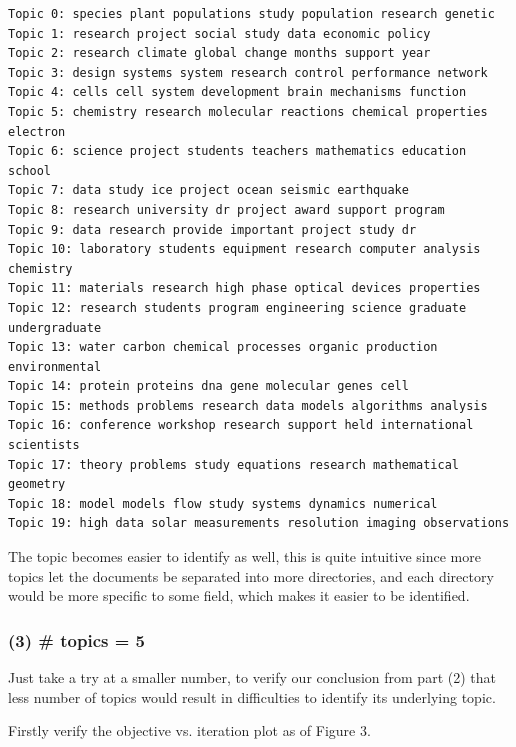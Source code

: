 \documentclass[submit]{harvardml}
\begin{document}
\begin{lstlisting}
Topic 0: species plant populations study population research genetic
Topic 1: research project social study data economic policy
Topic 2: research climate global change months support year
Topic 3: design systems system research control performance network
Topic 4: cells cell system development brain mechanisms function
Topic 5: chemistry research molecular reactions chemical properties electron
Topic 6: science project students teachers mathematics education school
Topic 7: data study ice project ocean seismic earthquake
Topic 8: research university dr project award support program
Topic 9: data research provide important project study dr
Topic 10: laboratory students equipment research computer analysis chemistry
Topic 11: materials research high phase optical devices properties
Topic 12: research students program engineering science graduate undergraduate
Topic 13: water carbon chemical processes organic production environmental
Topic 14: protein proteins dna gene molecular genes cell
Topic 15: methods problems research data models algorithms analysis
Topic 16: conference workshop research support held international scientists
Topic 17: theory problems study equations research mathematical geometry
Topic 18: model models flow study systems dynamics numerical
Topic 19: high data solar measurements resolution imaging observations
\end{lstlisting}

The topic becomes easier to identify as well, this is quite intuitive since more topics let the documents be separated into more directories, and each directory would be more specific to some field, which makes it easier to be identified.

\subsubsection*{(3) \# topics = 5}

Just take a try at a smaller number, to verify our conclusion from part (2) that less number of topics would result in difficulties to identify its underlying topic.

Firstly verify the objective vs. iteration plot as of Figure 3.
\end{document}

